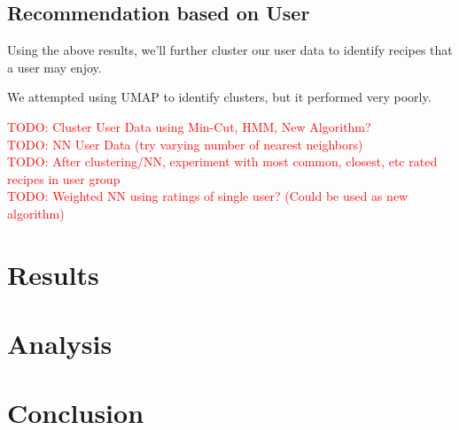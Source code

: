 \documentclass[11pt]{article}
\newcommand\todo[1]{\textcolor{red}{TODO: #1 \\}}
\begin{document}
\subsection{Recommendation based on User}
Using the above results, we'll further cluster our user data to identify recipes that a user may enjoy.

We attempted using UMAP to identify clusters, but it performed very poorly.

\todo{Cluster User Data using Min-Cut, HMM, New Algorithm?}
\todo{NN User Data (try varying number of nearest neighbors)}
\todo{After clustering/NN, experiment with most common, closest, etc rated recipes in user group}
\todo{Weighted NN using ratings of single user? (Could be used as new algorithm)}

\section{Results}

\section{Analysis}

\section{Conclusion}



\end{document}
